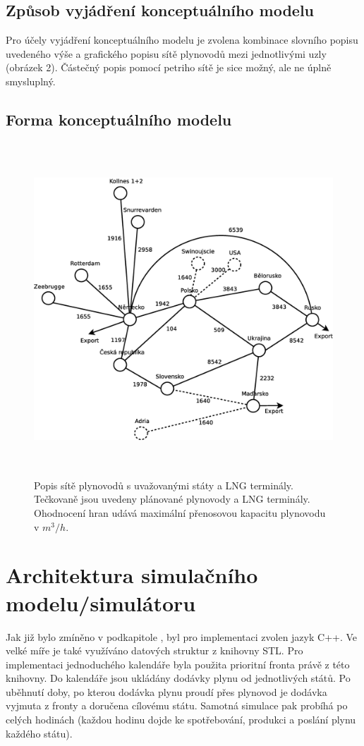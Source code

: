 \documentclass[a4paper,12pt]{article}
\begin{document}
  \subsection{Způsob vyjádření konceptuálního modelu}
  Pro účely vyjádření konceptuálního modelu je zvolena kombinace slovního popisu uvedeného výše a grafického popisu 
  sítě plynovodů mezi jednotlivými uzly (obrázek 2). Částečný popis pomocí petriho sítě je sice možný, ale ne úplně 
  smysluplný. 
  
  \subsection{Forma konceptuálního modelu}
  \begin{figure}[!ht]
    \centering
    \includegraphics[height=12.5cm]{img/model.eps}
    \caption{Popis sítě plynovodů s uvažovanými státy a LNG terminály. 
    Tečkovaně jsou uvedeny plánované plynovody a LNG terminály. Ohodnocení hran udává maximální přenosovou kapacitu plynovodu v $m^3/h$.}
  \end{figure}
  
  \section{Architektura simulačního modelu/simulátoru}
  Jak již bylo zmíněno v podkapitole , byl pro implementaci zvolen jazyk C++. Ve 
  velké míře je také využíváno datových struktur z knihovny STL. Pro implementaci jednoduchého kalendáře 
  byla použita prioritní fronta právě z této knihovny. Do kalendáře jsou ukládány dodávky plynu od 
  jednotlivých států. Po uběhnutí doby, po kterou dodávka plynu proudí přes plynovod je dodávka vyjmuta 
  z fronty a doručena cílovému státu. Samotná simulace pak probíhá po celých hodinách (každou hodinu 
  dojde ke spotřebování, produkci a poslání plynu každého státu).
  
\end{document}
